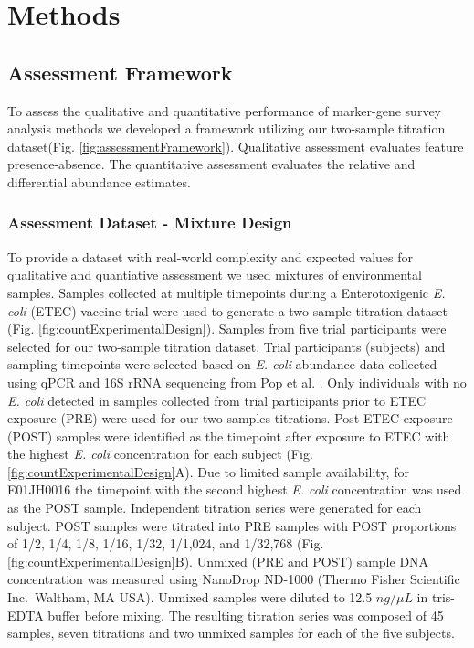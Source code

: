 \documentclass[linenumbers]{bmcart}
\begin{document}
\section*{Methods}

\subsection*{Assessment Framework}
To assess the qualitative and quantitative performance of marker-gene survey analysis methods we developed a framework utilizing our two-sample titration dataset(Fig. \ref{fig:assessmentFramework}).
Qualitative assessment evaluates feature presence-absence.
The quantitative assessment evaluates the relative and differential abundance estimates.

\subsubsection*{Assessment Dataset - Mixture Design}
To provide a dataset with real-world complexity and expected values for  qualitative and quantiative assessment we used mixtures of environmental samples.
Samples collected at multiple timepoints during a Enterotoxigenic
\emph{E. coli} (ETEC) vaccine trial \cite{harro2011refinement} were
used to generate a two-sample titration dataset (Fig.
\ref{fig:countExperimentalDesign}). Samples from five trial
participants were selected for our two-sample titration dataset. Trial
participants (subjects) and sampling timepoints were selected based on
\emph{E. coli} abundance data collected using qPCR and 16S rRNA
sequencing from Pop et al. \cite{pop2016individual}. Only individuals with no
\emph{E. coli} detected in samples collected from trial participants
prior to ETEC exposure (PRE) were used for our two-samples titrations.
Post ETEC exposure (POST) samples were identified as the timepoint after
exposure to ETEC with the highest \emph{E. coli} concentration for each
subject (Fig. \ref{fig:countExperimentalDesign}A). Due to limited sample
availability, for E01JH0016 the timepoint with the second highest
\emph{E. coli} concentration was used as the POST sample. Independent
titration series were generated for each subject. POST samples
were titrated into PRE samples with POST proportions of 1/2, 1/4, 1/8,
1/16, 1/32, 1/1,024, and 1/32,768 (Fig.
\ref{fig:countExperimentalDesign}B). Unmixed (PRE and POST) sample DNA
concentration was measured using NanoDrop ND-1000 (Thermo Fisher
Scientific Inc.~Waltham, MA USA). Unmixed samples were diluted to 12.5
\(ng/\mu L\) in tris-EDTA buffer before mixing. The resulting titration series
was composed of 45 samples, seven titrations and two unmixed samples for each
of the five subjects.
\end{document}
